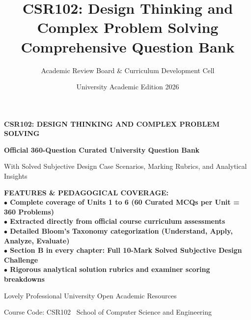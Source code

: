 \documentclass[a4paper,11pt,oneside,openany]{book}
\title{CSR102: Design Thinking and Complex Problem Solving\\Comprehensive Question Bank}
\author{Academic Review Board \& Curriculum Development Cell}
\date{University Academic Edition 2026}
\begin{document}
\frontmatter

\begin{titlepage}
    \centering
    \vspace*{2cm}
    {\Huge\bfseries\color{LPUNavy} CSR102: DESIGN THINKING AND COMPLEX PROBLEM SOLVING\par}
    \vspace{1cm}
    {\Large\bfseries\color{LPUOrange} Official 360-Question Curated University Question Bank\par}
    \vspace{0.5cm}
    {\large With Solved Subjective Design Case Scenarios, Marking Rubrics, and Analytical Insights\par}
    \vspace{2cm}
    \begin{tcolorbox}[colback=LightBg,colframe=LPUNavy,arc=3mm,boxrule=1pt,width=0.85\textwidth]
        \centering\bfseries\color{LPUNavy}
        FEATURES \& PEDAGOGICAL COVERAGE:\\[2mm]
        \normalfont\small
        $\bullet$ Complete coverage of Units 1 to 6 (60 Curated MCQs per Unit = 360 Problems)\\[1mm]
        $\bullet$ Extracted directly from official course curriculum assessments\\[1mm]
        $\bullet$ Detailed Bloom's Taxonomy categorization (Understand, Apply, Analyze, Evaluate)\\[1mm]
        $\bullet$ Section B in every chapter: Full 10-Mark Solved Subjective Design Challenge\\[1mm]
        $\bullet$ Rigorous analytical solution rubrics and examiner scoring breakdowns
    \end{tcolorbox}
    \vfill
    {\large Lovely Professional University Open Academic Resources\par}
    {\small Course Code: CSR102 \textbullet\ School of Computer Science and Engineering\par}
    \vspace*{1.5cm}
\end{titlepage}

\tableofcontents
\newpage

\mainmatter







\end{document}

